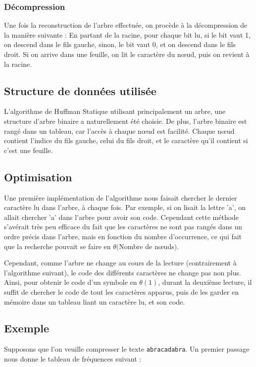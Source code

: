 \documentclass{article}
\begin{document}
\subsubsection{D\'ecompression}
Une fois la reconstruction de l'arbre effectu\'ee, on proc\`ede \`a la d\'ecompression de la mani\`ere suivante :
En partant de la racine, pour chaque bit lu, si le bit vaut 1, on descend dans le fils gauche, sinon, le bit vaut 0, et on descend dans le fils droit. Si on arrive dans une feuille, on lit le caract\`ere du n{\oe}ud, puis on revient \`a la racine.

\subsection{Structure de donn\'ees utilis\'ee}
L'algorithme de Huffman Statique utilisant principalement un arbre, une structure d'arbre binaire a naturellement \'et\'e choisie. De plus, l'arbre binaire est rang\'e dans un tableau, car l'acc\`es \`a chaque n{\oe}ud est facilit\'e. Chaque n{\oe}ud contient l'indice du fils gauche, celui du fils droit, et le caract\`ere qu'il contient si c'est une feuille.

\subsection{Optimisation}

Une premi\`ere impl\'ementation de l'algorithme nous faisait chercher le dernier caract\`ere lu dans l'arbre, \`a chaque fois. Par exemple, si on lisait la lettre 'a', on allait chercher 'a' dans l'arbre pour avoir son code.
Cependant cette m\'ethode s'av\'erait tr\`es peu efficace du fait que les caract\`eres ne sont pas rang\'es dans un ordre pr\'ecis dans l'arbre, mais en fonction du nombre d'occurrence, ce qui fait que la recherche pouvait se faire en $\theta($Nombre de n{\oe}uds$)$.

Cependant, comme l'arbre ne change au cours de la lecture (contrairement \`a l'algorithme suivant), le code des diff\'erents caract\`eres ne change pas non plus. Ainsi, pour obtenir le code d'un symbole en $\theta(1)$, durant la deuxi\`eme lecture, il suffit de chercher le code de tout les caract\`eres apparus, puis de les garder en m\'emoire dans un tableau liant un caract\`ere lu, et son code.


\subsection{Exemple}
Supposons que l'on veuille compresser le texte \texttt{abracadabra}.
Un premier passage nous donne le tableau de fr\'equences suivant :
\end{document}
